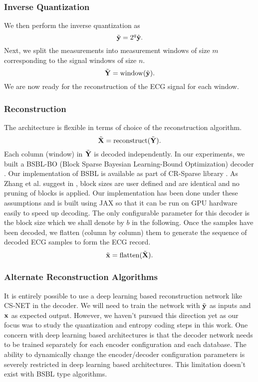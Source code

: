 \subsubsection{Inverse Quantization}
We then perform the inverse quantization as
\begin{equation}
\tilde{\mathbf{y}} = 2^q \hat{\mathbf{y}}.
\end{equation}
Next, we split the measurements into measurement windows of size $m$
corresponding to the signal windows of size $n$.
\begin{equation}
\tilde{\mathbf{Y}} = \mathrm{window}(\tilde{\mathbf{y}}).
\end{equation}
We are now ready for the reconstruction of the ECG signal for each window.
\subsubsection{Reconstruction}
The architecture is flexible in terms of choice of the
reconstruction algorithm.
\begin{equation}
\tilde{\mathbf{X}} = \mathrm{reconstruct}(\tilde{\mathbf{Y}}).
\end{equation}
Each column (window) in $\tilde{\mathbf{Y}}$ is decoded independently.
In our experiments, we built
a BSBL-BO (Block Sparse Bayesian Learning-Bound Optimization)
decoder \cite{zhang2013extension,zhang2012compressed,zhang2016comparison}.
Our implementation of BSBL is available as part of CR-Sparse library
\cite{kumar2021cr}. As Zhang et al. suggest in \cite{zhang2012compressed},
block sizes are user defined and are identical and
no pruning of blocks is applied. Our implementation has been
done under these assumptions and is built using JAX so that it can
be run on GPU hardware easily to speed up decoding.
The only configurable parameter for this decoder is the block size
which we shall denote by $b$ in the following.
Once the samples have been decoded,
we flatten (column by column) them to generate
the sequence of decoded ECG samples to form the ECG record.
\begin{equation}
\tilde{\mathbf{x}} = \mathrm{flatten}(\tilde{\mathbf{X}}).
\end{equation}

\subsubsection{Alternate Reconstruction Algorithms}
It is entirely possible to use a deep learning based
reconstruction network like CS-NET \cite{zhang2021csnet}
in the decoder. We will need to train the network with
$\tilde{\mathbf{y}}$ as inputs and $\mathbf{x}$ as expected output.
However, we haven't pursued this direction yet as our
focus was to study the quantization and entropy coding
steps in this work. One concern with deep learning
based architectures is that the decoder network
needs to be trained separately for each encoder
configuration and each database. The ability
to dynamically change the encoder/decoder
configuration parameters is severely restricted
in deep learning based architectures.
This limitation doesn't exist with BSBL type
algorithms.

